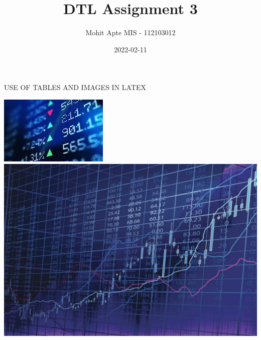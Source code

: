 \documentclass{article}
\title{\textbf{DTL Assignment 3}}
\date{2022-02-11}
\author{Mohit Apte MIS - 112103012}
\begin{document}
\maketitle
\begin{LARGE}
\begin{center}
USE OF TABLES AND IMAGES IN LATEX
\end{center}
\end{LARGE}
\newpage
\begin{center}
\includegraphics[width=\textwidth]{stock}
\includegraphics[width=\textwidth]{stock3}
\end{center}
\end{document}

